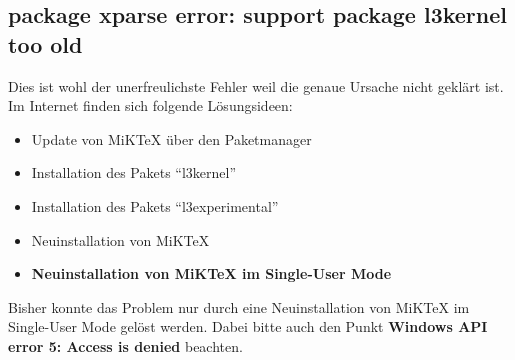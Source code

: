 \subsection{package xparse error: support package l3kernel too old}
Dies ist wohl der unerfreulichste Fehler weil die genaue Ursache nicht geklärt ist.
Im Internet finden sich folgende Lösungsideen:
\begin{itemize}
	\item Update von MiKTeX über den Paketmanager
	\item Installation des Pakets "`l3kernel"'
	\item Installation des Pakets "`l3experimental"'
	\item Neuinstallation von MiKTeX
	\item \textbf{Neuinstallation von MiKTeX im Single-User Mode}
\end{itemize}
Bisher konnte das Problem nur durch eine Neuinstallation von MiKTeX im Single-User Mode gelöst werden. Dabei bitte auch den Punkt \textbf{Windows API error 5: Access is denied} beachten.

